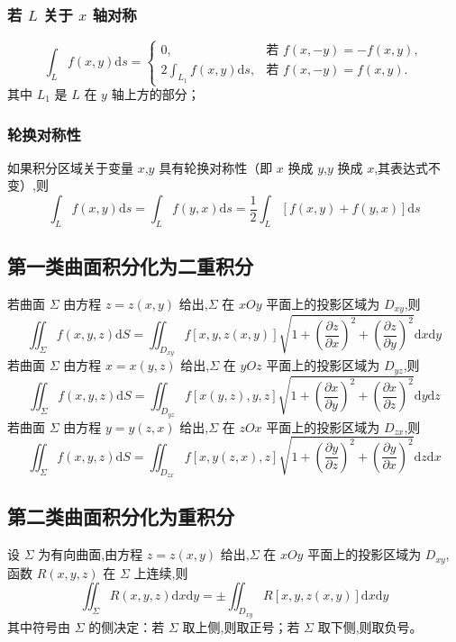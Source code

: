 \documentclass[UTF8]{ctexart}
\theoremstyle{remark}
\begin{document}
			\subsubsection{若 \( L \) 关于 \( x \) 轴对称}
			\[
			\int_{L} f(x, y) \mathrm{d}s = 
			\begin{cases}
				0, & \text{若 } f(x, -y) = -f(x, y), \\
				2\int_{L_1} f(x, y) \mathrm{d}s, & \text{若 } f(x, -y) = f(x, y).
			\end{cases}
			\]
			其中 \( L_1 \) 是 \( L \) 在 \( y \) 轴上方的部分；
			
			\subsubsection{轮换对称性}
			如果积分区域关于变量 \( x \),\( y \) 具有轮换对称性（即 \( x \) 换成 \( y \),\( y \) 换成 \( x \),其表达式不变）,则
			\[
			\int_{L} f(x, y) \mathrm{d}s = \int_{L} f(y, x) \mathrm{d}s = \frac{1}{2} \int_{L} [f(x, y) + f(y, x)] \mathrm{d}s
			\]
			
			\subsection{第一类曲面积分化为二重积分}
			若曲面 \( \Sigma \) 由方程 \( z = z(x, y) \) 给出,\( \Sigma \) 在 \( xOy \) 平面上的投影区域为 \( D_{xy} \),则
			\[
			\iint_{\Sigma} f(x, y, z) \mathrm{d}S = \iint_{D_{xy}} f[x, y, z(x, y)] \sqrt{1 + \left( \frac{\partial z}{\partial x} \right)^2 + \left( \frac{\partial z}{\partial y} \right)^2} \mathrm{d}x \mathrm{d}y
			\]
			若曲面 \( \Sigma \) 由方程 \( x = x(y, z) \) 给出,\( \Sigma \) 在 \( yOz \) 平面上的投影区域为 \( D_{yz} \),则
			\[
			\iint_{\Sigma} f(x, y, z) \mathrm{d}S = \iint_{D_{yz}} f[x(y, z), y, z] \sqrt{1 + \left( \frac{\partial x}{\partial y} \right)^2 + \left( \frac{\partial x}{\partial z} \right)^2} \mathrm{d}y \mathrm{d}z
			\]
			若曲面 \( \Sigma \) 由方程 \( y = y(z, x) \) 给出,\( \Sigma \) 在 \( zOx \) 平面上的投影区域为 \( D_{zx} \),则
			\[
			\iint_{\Sigma} f(x, y, z) \mathrm{d}S = \iint_{D_{zx}} f[x, y(z, x), z] \sqrt{1 + \left( \frac{\partial y}{\partial z} \right)^2 + \left( \frac{\partial y}{\partial x} \right)^2} \mathrm{d}z \mathrm{d}x
			\]
			
			\subsection{第二类曲面积分化为重积分}
			设 \( \Sigma \) 为有向曲面,由方程 \( z = z(x, y) \) 给出,\( \Sigma \) 在 \( xOy \) 平面上的投影区域为 \( D_{xy} \),函数 \( R(x, y, z) \) 在 \( \Sigma \) 上连续,则
			\[
			\iint_{\Sigma} R(x, y, z) \mathrm{d}x \mathrm{d}y = \pm \iint_{D_{xy}} R[x, y, z(x, y)] \mathrm{d}x \mathrm{d}y
			\]
			其中符号由 \( \Sigma \) 的侧决定：若 \( \Sigma \) 取上侧,则取正号；若 \( \Sigma \) 取下侧,则取负号。
			
\end{document}
